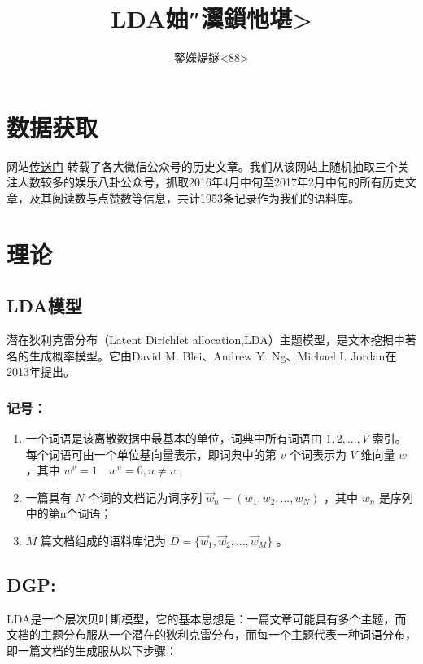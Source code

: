 \documentclass[]{article}
\title{LDA妯″瀷鎻忚堪\textgreater{}}
\author{鐜嬫煶鐩\textless{}88\textgreater{}}
\date{}
\begin{document}
\maketitle

\section{数据获取}

网站\href{http://chuansong.me/}{传送门}
转载了各大微信公众号的历史文章。我们从该网站上随机抽取三个关注人数较多的娱乐八卦公众号，抓取2016年4月中旬至2017年2月中旬的所有历史文章，及其阅读数与点赞数等信息，共计1953条记录作为我们的语料库。

\section{理论}

\subsection{LDA模型}\label{lda}

潜在狄利克雷分布（Latent Dirichlet
allocation,LDA）主题模型，是文本挖掘中著名的生成概率模型。它由David M.
Blei、Andrew Y. Ng、Michael I. Jordan在2013年提出。

\subsubsection{记号：}

\begin{enumerate}
\def\labelenumi{\arabic{enumi}.}
\item
  一个词语是该离散数据中最基本的单位，词典中所有词语由 \({1,2,...,V}\)
  索引。每个词语可由一个单位基向量表示，即词典中的第 \(v\) 个词表示为
  \(V\) 维向量 \(w\) ，其中 \(w^v=1\quad w^u=0,u\neq v\) ;
\item
  一篇具有 \(N\) 个词的文档记为词序列 \(\vec w_n=(w_1,w_2,...,w_N)\)
  ，其中 \(w_n\) 是序列中的第n个词语；
\item
  \(M\) 篇文档组成的语料库记为
  \(D=\{{\vec w}_1,{\vec w}_2,...,{\vec w}_M\}\) 。
\end{enumerate}

\subsection{DGP:}\label{dgp}

LDA是一个层次贝叶斯模型，它的基本思想是：一篇文章可能具有多个主题，而文档的主题分布服从一个潜在的狄利克雷分布，而每一个主题代表一种词语分布，即一篇文档的生成服从以下步骤：
\end{document}
